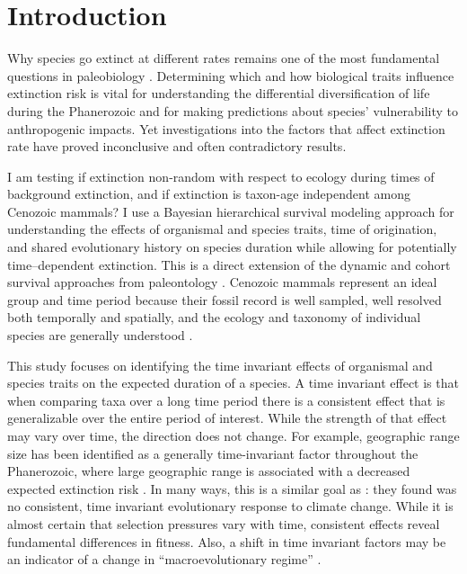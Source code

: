 \documentclass[12pt,letterpaper]{article}
\begin{document}
\section{Introduction}

Why species go extinct at different rates remains one of the most fundamental questions in paleobiology \citep{Simpson1944,VanValen1973,Raup1991b,Raup1994,Quental2013,Wagner2014b,Jablonski2005,Payne2007,Kitchell1986}. Determining which and how biological traits influence extinction risk is vital for understanding the differential diversification of life during the Phanerozoic and for making predictions about species' vulnerability to anthropogenic impacts. Yet investigations into the factors that affect extinction rate have proved inconclusive and often contradictory results. 

I am testing if extinction non-random with respect to ecology during times of background extinction, and if extinction is taxon-age independent among Cenozoic mammals? I use a Bayesian hierarchical survival modeling approach for understanding the effects of organismal and species traits, time of origination, and shared evolutionary history on species duration while allowing for potentially time--dependent extinction. This is a direct extension of the dynamic and cohort survival approaches from paleontology \citep{Simpson1944,VanValen1973,Foote1988,Raup1978,Raup1975,VanValen1979,Baumiller1993,Sepkoski1975}. Cenozoic mammals represent an ideal group and time period because their fossil record is well sampled, well resolved both temporally and spatially, and the ecology and taxonomy of individual species are generally understood \citep{Alroy2009,Alroy2000g,Jernvall2002,Liow2008,Smith2004,Quental2013,Alroy1996a,Alroy1998,Simpson1944,Blois2009,Tomiya2013,Marcot2014}. 

This study focuses on identifying the time invariant effects of organismal and species traits on the expected duration of a species. A time invariant effect is that when comparing taxa over a long time period there is a consistent effect that is generalizable over the entire period of interest. While the strength of that effect may vary over time, the direction does not change. For example, geographic range size has been identified as a generally time-invariant factor throughout the Phanerozoic, where large geographic range is associated with a decreased expected extinction risk \citep{Payne2007}.  In many ways, this is a similar goal as \citet{Alroy2000g}: they found was no consistent, time invariant evolutionary response to climate change. While it is almost certain that selection pressures vary with time, consistent effects reveal fundamental differences in fitness. Also, a shift in time invariant factors may be an indicator of a change in ``macroevolutionary regime'' \citep{Jablonski1986}.
\end{document}
